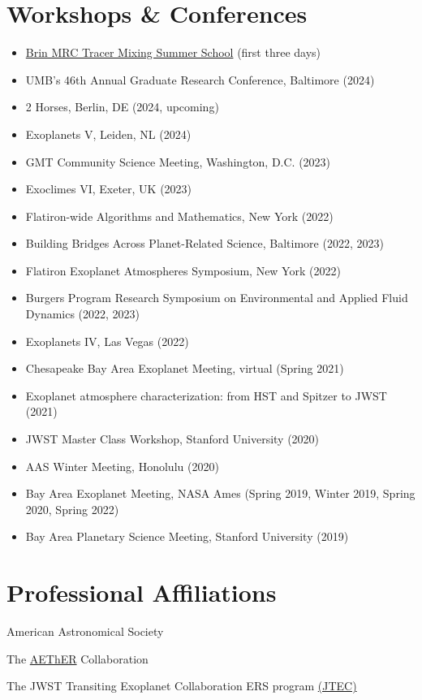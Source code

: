 \documentclass[letterpaper,10.5pt]{article}
\newcommand{\resumeItem}[2]{
  \item\small{
    \textbf{#1}{#2 \vspace{-2pt}}
  }
}
\newcommand{\resumeSubHeadingListStart}{\begin{itemize}[leftmargin=*]}
\newcommand{\resumeItemListStart}{\begin{itemize}}
\newcommand{\resumeItemListEnd}{\end{itemize}\vspace{-5pt}}
\newcommand{\shorterSection}[1]{\vspace{-10pt}\section{#1}}
\begin{document}
\shorterSection{Workshops \& Conferences}
\resumeItemListStart
\resumeItem{}{\href{https://brinmrc.umd.edu/programs/schools/summer24/summer24-school-mixing.html}{Brin MRC Tracer Mixing Summer School} (first three days)}
\resumeItem{}{UMB's 46th Annual Graduate Research Conference, Baltimore (2024)}
\resumeItem{}{2 Horses, Berlin, DE (2024, upcoming)}
\resumeItem{}{Exoplanets V, Leiden, NL (2024)}
\resumeItem{}{GMT Community Science Meeting, Washington, D.C. (2023)}
\resumeItem{}{Exoclimes VI, Exeter, UK (2023)}
\resumeItem{}{Flatiron-wide Algorithms and Mathematics, New York (2022)}
\resumeItem{}{Building Bridges Across Planet-Related Science, Baltimore (2022, 2023)}
\resumeItem{}{Flatiron Exoplanet Atmospheres Symposium, New York (2022)}
\resumeItem{}{Burgers Program Research
Symposium on Environmental and Applied Fluid Dynamics (2022, 2023)}
\resumeItem{}{Exoplanets IV, Las Vegas (2022)}
\resumeItem{}{Chesapeake Bay Area Exoplanet Meeting, virtual (Spring 2021)}
\resumeItem{}{Exoplanet atmosphere characterization: from HST and Spitzer to JWST (2021)}
\resumeItem{}{JWST Master Class Workshop, Stanford University (2020)}
\resumeItem{}{AAS Winter Meeting, Honolulu (2020)}
\resumeItem{}{Bay Area Exoplanet Meeting, NASA Ames (Spring 2019, Winter 2019, Spring 2020, Spring 2022)}
\resumeItem{}{Bay Area Planetary Science Meeting, Stanford University (2019)}
\resumeItemListEnd

\shorterSection{Professional Affiliations}
\small
  \begin{list}{}{\cvlist}
  \item[{\color{numcolor}}]American Astronomical Society
  \item[{\color{numcolor}}]The \href{https://planets.carnegiescience.edu/}{AEThER} Collaboration
  \item[{\color{numcolor}}]The JWST Transiting Exoplanet Collaboration ERS program \href{https://ers-transit.github.io/}{(JTEC)}



  \end{list}
\end{document}
